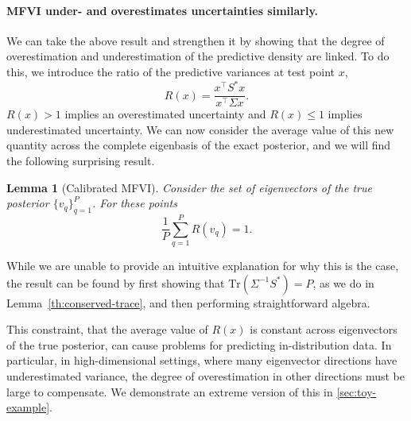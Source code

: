 \documentclass{article}
\theoremstyle{plain}
\newtheorem{lemma}[theorem]{Lemma}
\theoremstyle{definition}
\theoremstyle{remark}
\theoremstyle{plain}
\newcommand{\posterior}{\Sigma}
\newcommand{\Tr}[1]{\text{Tr}\left(#1\right)}
\begin{document}
\paragraph{MFVI under- and overestimates uncertainties similarly.} We can take the above result and strengthen it by showing that the degree of overestimation and underestimation of the predictive density are linked.
To do this, we introduce the ratio of the predictive variances at test point $x$, 
\begin{equation} \label{eq:ratio-of-vars}
    R(x) = \frac{x^\top S^*  x }{x^\top \posterior x }. 
\end{equation} 
$R(x)>1$ implies an overestimated uncertainty and $R(x)\leq 1$ implies underestimated uncertainty. We can now consider the average value of this new quantity across the complete eigenbasis of the exact posterior, and we will find the following surprising result.
\begin{lemma}
[Calibrated MFVI]
\label{th:calibrated-points}
    Consider the set of eigenvectors of the true posterior $\{v_q\}_{q=1}^P$. For these points 
    \begin{equation}
     \frac{1}{P}\sum_{q=1}^P R(v_q ) = 1.  
    \end{equation}
\end{lemma}
While we are unable to provide an intuitive explanation for why this is the case, the result can be found by first showing that $\Tr{\posterior^{-1}S^*}=P$, as we do in Lemma~\ref{th:conserved-trace}, and then performing straightforward algebra.  

This constraint, that the average value of $R(x)$ is constant across eigenvectors of the true posterior, can cause problems for predicting in-distribution data. In particular, in high-dimensional settings, where many eigenvector directions have underestimated variance, the degree of overestimation in other directions must be large to compensate. We demonstrate an extreme version of this in \cref{sec:toy-example}.
\end{document}
